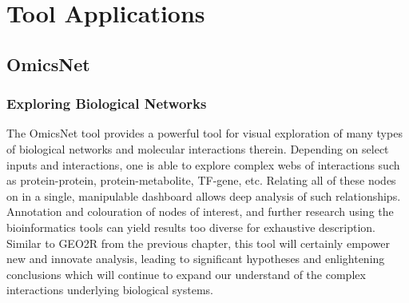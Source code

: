 \section{Tool Applications}

    \subsection{OmicsNet}
            \subsubsection{Exploring Biological Networks}
            The OmicsNet tool provides a powerful tool for visual exploration of many types of biological networks and molecular interactions therein.\autocite{L10} Depending on select inputs and interactions, one is able to explore complex webs of interactions such as protein-protein, protein-metabolite, TF-gene, etc. Relating all of these nodes on in a single, manipulable dashboard allows deep analysis of such relationships. Annotation and colouration of nodes of interest, and further research using the bioinformatics tools can yield results too diverse for exhaustive description. Similar to GEO2R from the previous chapter, this tool will certainly empower new and innovate analysis, leading to significant hypotheses and enlightening conclusions which will continue to expand our understand of the complex interactions underlying biological systems.



